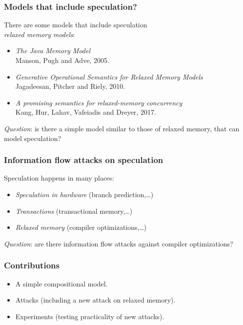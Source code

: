 \documentclass{beamer}
\begin{document}
\begin{frame}
  \frametitle{Models that include speculation?}

  There are some models that include speculation\\
  \emph{relaxed memory models}:

  \begin{itemize}\footnotesize
  \item \emph{The Java Memory Model}\\
    Manson, Pugh and Adve, 2005.
  \item \emph{Generative Operational Semantics for Relaxed Memory Models}\\
    Jagadeesan, Pitcher and Riely, 2010.
  \item \emph{A promising semantics for relaxed-memory concurrency}\\
    Kang, Hur, Lahav, Vafeiadis and Dreyer, 2017.
  \end{itemize}

  \pause
  \emph{Question}: is there a simple model similar to
  those of relaxed memory, that can model speculation?
\end{frame}

\begin{frame}
  \frametitle{Information flow attacks on speculation}
  Speculation happens in many places:
  \begin{itemize}\footnotesize
  \item \emph{Speculation in hardware} (branch prediction,\ldots) \\
  \item \emph{Transactions} (transactional memory,\ldots)\\
  \item \emph{Relaxed memory} (compiler optimizations,\ldots)\\
  \end{itemize}
  
  \pause
  \emph{Question}: are there information flow attacks against
  compiler optimizations?
\end{frame}

\begin{frame}
  \frametitle{Contributions}
  \begin{itemize}\footnotesize
  \item A simple compositional model.
  \item Attacks (including a new attack on relaxed memory).
  \item Experiments (testing practicality of new attacks).
  \end{itemize}
\end{frame}
\end{document}
